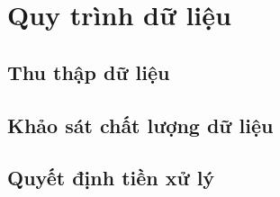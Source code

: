 \section{Quy trình dữ liệu}



\subsection{Thu thập dữ liệu}





\subsection{Khảo sát chất lượng dữ liệu}



\subsection{Quyết định tiền xử lý}

